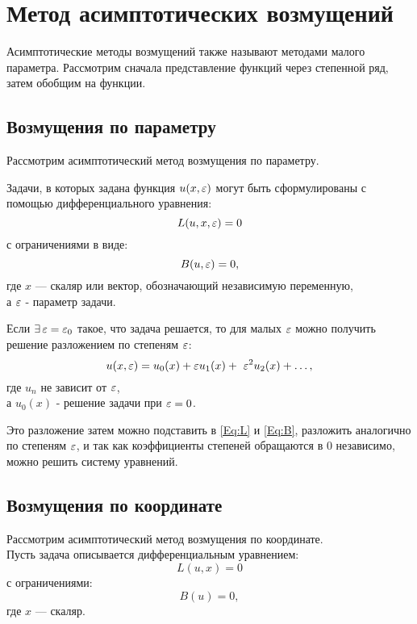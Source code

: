 \chapter*{Метод асимптотических возмущений}

Асимптотические методы возмущений
также называют методами малого параметра.
Рассмотрим сначала представление функций
через степенной ряд, затем обобщим на функции.

\section*{Возмущения по параметру}
Рассмотрим асимптотический метод возмущения по параметру.

Задачи, в которых задана функция $u(x, \varepsilon)$
могут быть сформулированы с помощью
дифференциального уравнения:
\begin{equation}
    \label{Eq:L}
    L(u, x, \varepsilon) = 0
\end{equation}
с ограничениями в виде:
\begin{equation}
    \label{Eq:B}
    B(u, \varepsilon) = 0,
\end{equation}
где $x$ --- скаляр или вектор, обозначающий независимую переменную,\\
а $\varepsilon$ - параметр задачи.

Если $\exists \, \varepsilon = \varepsilon_0$
такое, что задача решается, то для малых $\varepsilon$
можно получить решение разложением по степеням $\varepsilon$:
\begin{equation*}
   u(x, \varepsilon) = u_0(x) + \varepsilon u_1(x) + \
   \varepsilon^2 u_2(x) + \dots,
\end{equation*}
где $u_n$ не зависит от $\varepsilon$,\\
а $u_0(x)$ - решение задачи при $\varepsilon = 0$.

Это разложение затем можно подставить
в \eqref{Eq:L} и \eqref{Eq:B},
разложить аналогично по степеням $\varepsilon$,
и так как коэффициенты степеней обращаются в 0 независимо,
можно решить систему уравнений.

\clearpage
\section*{Возмущения по координате}

Рассмотрим асимптотический метод возмущения по координате.\\
Пусть задача описывается дифференциальным уравнением:
\begin{equation*}
    L(u, x) = 0
\end{equation*}
с ограничениями:
\begin{equation*}
    B(u) = 0,
\end{equation*}
где $x$ --- скаляр.

